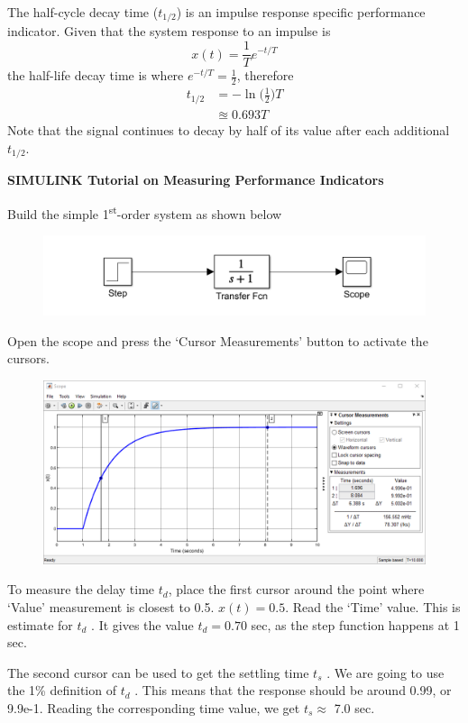 \documentclass[12pt,letter]{article}
\begin{document}
The half-cycle decay time ($t_{1/2}$) is an impulse response specific performance indicator. Given that the system response to an impulse is
\begin{equation}
x(t) = \frac{1}{T} e^{-t/T}
\end{equation}
the half-life decay time is where $e^{-t/T} = \frac{1}{2}$, therefore
\begin{align}
t_{1/2} &= - \ln \bigg(\frac{1}{2} \bigg) T \\
&\approxeq 0.693T \nonumber
\end{align}
Note that the signal continues to decay by half of its value after each additional $t_{1/2}$.





\begin{example}

\textbf{SIMULINK Tutorial on Measuring Performance Indicators}

Build the simple 1\textsuperscript{st}-order system as shown below
\begin{figure}[H]
	\centering
	\includegraphics[width=4.5in]{../figures/Simulink_step_model_transfer}
\end{figure}
Open the scope and press the `Cursor Measurements' button to activate the cursors.

\begin{figure}[H]
	\centering
	\includegraphics[width=6.0in]{../figures/Simulink_step_model_transfer_cursor_measurements}
\end{figure}




To measure the delay time $t_d$, place the first cursor around the point where `Value' measurement is closest to 0.5. $x(t) = 0.5$. Read the `Time' value. This is estimate for $t_d$ . It gives the value $t_d = 0.70$ sec, as the step function happens at 1 sec. 

The second cursor can be used to get the settling time $t_s$ . We are going to use the 1\% definition of $t_d$ . This means that the response should be around 0.99, or 9.9e-1. Reading the corresponding time value, we get $t_s \approx$  7.0 sec. 

\end{example}
\end{document}
